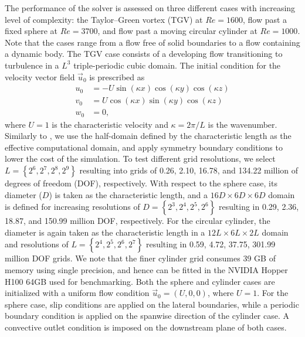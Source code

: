 \documentclass[final,3p,times]{elsarticle}
\begin{document}
The performance of the solver is assessed on three different cases with increasing level of complexity: the Taylor--Green vortex (TGV) at $Re=1600$, flow past a fixed sphere at $Re=3700$, and flow past a moving circular cylinder at $Re=1000$. Note that the cases range from a flow free of solid boundaries to a flow containing a dynamic body. The TGV case consists of a developing flow transitioning to turbulence in a $L^3$ triple-periodic cubic domain. The initial condition for the velocity vector field $\vec{u}_0$ is prescribed as
\begin{align}
u_0 &= -U\sin(\kappa x)\cos(\kappa y)\cos(\kappa z) \\
v_0 &= U\cos(\kappa x)\sin(\kappa y)\cos(\kappa z) \\
w_0 &= 0,
\end{align}
where $U=1$ is the characteristic velocity and $\kappa=2\pi/L$ is the wavenumber. Similarly to \cite{Dairay2017}, we use the half-domain defined by the characteristic length as the effective computational domain, and apply symmetry boundary conditions to lower the cost of the simulation. To test different grid resolutions, we select $L=\left\{2^6,2^7,2^8,2^9\right\}$ resulting into grids of 0.26, 2.10, 16.78, and 134.22 million of degrees of freedom (DOF), respectively. With respect to the sphere case, its diameter ($D$) is taken as the characteristic length, and a $16D\times6D\times6D$ domain is defined for increasing resolutions of $D=\left\{2^3,2^4,2^5,2^6\right\}$ resulting in 0.29, 2.36, 18.87, and 150.99 million DOF, respectively. For the circular cylinder, the diameter is again taken as the characteristic length in a $12L\times6L\times2L$ domain and resolutions of $L=\left\{2^4,2^5,2^6,2^7\right\}$ resulting in 0.59, 4.72, 37.75, 301.99 million DOF grids. We note that the finer cylinder grid consumes 39 GB of memory using single precision, and hence can be fitted in the NVIDIA Hopper H100 64GB used for benchmarking. Both the sphere and cylinder cases are initialized with a uniform flow condition $\vec{u}_0=(U,0,0)$, where $U=1$. For the sphere case, slip conditions are applied on the lateral boundaries, while a periodic boundary condition is applied on the spanwise direction of the cylinder case. A convective outlet condition is imposed on the downstream plane of both cases.
\end{document}
